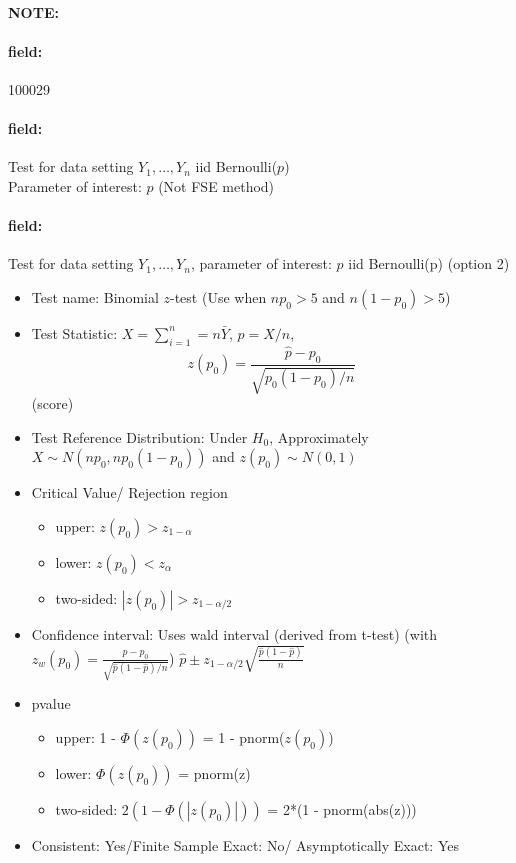 \documentclass[12pt]{article}
\newenvironment{note}{\paragraph{NOTE:}}{}
\newenvironment{field}{\paragraph{field:}}{}
\begin{document}
\begin{note} \begin{field} \tiny 100029 \end{field}
 \begin{field}
  Test for data setting $Y_1, \ldots, Y_n$ iid Bernoulli($p$)\\
  Parameter of interest: $p$  (Not FSE method)
 \end{field}
 \begin{field}
  Test for data setting $Y_1, \ldots, Y_n$, parameter of interest: $p$ iid Bernoulli(p) (option 2)
  \begin{itemize}
   \item Test name: Binomial $z$-test (Use when $np_0 > 5$ and $n(1-p_0) > 5$)
   \item Test Statistic: $X  = \sum_{i=1}^n = n\bar{Y}$, $\hat{p} = X/n$, $$z(p_0) = \frac{\hat{p}- p_0}{\sqrt{p_0(1-p_0)/n}}$$ (score)
   \item Test Reference Distribution: Under $H_0$, Approximately $X \sim N(np_0,np_0(1-p_0))$ and $z(p_0) \sim N(0,1)$
   \item Critical Value/ Rejection region
         \begin{itemize}
          \item upper: $z(p_0) > z_{1-\alpha}$
          \item lower: $z(p_0) < z_\alpha$
          \item two-sided: $|z(p_0)| > z_{1-\alpha/2}$
         \end{itemize}
   \item Confidence interval: Uses wald interval (derived from t-test) (with $z_w(p_0) = \frac{\hat{p} - p_0}{\sqrt{\hat{p}(1 - \hat{p})/n}}$) $\hat{p} \pm z_{1-\alpha/2}\sqrt{\frac{\hat{p}(1 - \hat{p})}{n}}$
   \item pvalue
         \begin{itemize}
          \item upper: 1 - $\Phi(z(p_0))$ = 1 - pnorm($z(p_0)$)
          \item lower: $\Phi(z(p_0))$ = pnorm(z)
          \item two-sided: $2(1 - \Phi(|z(p_0)|))$ = 2*(1 - pnorm(abs(z)))
         \end{itemize}
   \item Consistent: Yes/Finite Sample Exact: No/ Asymptotically Exact: Yes
  \end{itemize}
 \end{field}
\end{note}
\end{document}
